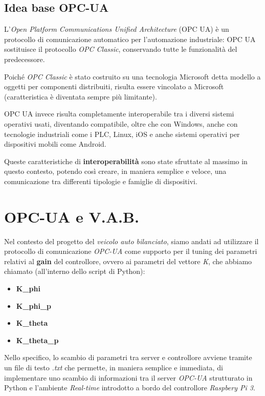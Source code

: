 \subsection{Idea base OPC-UA}
L'\textit{Open Platform Communications Unified Architecture} (OPC UA) è un protocollo di comunicazione automatico per l'automazione industriale: OPC UA sostituisce il protocollo \textit{OPC Classic}, conservando tutte le funzionalità del predecessore.

Poiché \textit{OPC Classic} è stato costruito su una tecnologia Microsoft detta modello a oggetti per componenti distribuiti, risulta essere vincolato a Microsoft (caratteristica è diventata sempre più limitante).

OPC UA invece risulta completamente interoperabile tra i diversi sistemi operativi usati, diventando compatibile, oltre che con Windows, anche con tecnologie industriali come i PLC, Linux, iOS e anche sistemi operativi per dispositivi mobili come Android.

Queste caratteristiche di \textbf{interoperabilità} sono state sfruttate al massimo in questo contesto, potendo così creare, in maniera semplice e veloce, una comunicazione tra differenti tipologie e famiglie di dispositivi.

\newpage
\section{OPC-UA e V.A.B.}
Nel contesto del progetto del \textit{veicolo auto bilanciato}, siamo andati ad utilizzare il protocollo di comunicazione \textit{OPC-UA} come supporto per il tuning dei parametri relativi al \textbf{gain} del controllore, ovvero ai parametri del vettore \textit{K}, che abbiamo chiamato (all'interno dello script di Python):
\begin{itemize}
	\item \textbf{K\_phi}
	\item \textbf{K\_phi\_p}
	\item \textbf{K\_theta}
	\item \textbf{K\_theta\_p}
\end{itemize}

Nello specifico, lo scambio di parametri tra server e controllore avviene tramite un file di testo \textit{.txt} che permette, in maniera semplice e immediata, di implementare uno scambio di informazioni tra il server \textit{OPC-UA} strutturato in Python e l'ambiente \textit{Real-time} introdotto a bordo del controllore \textit{Raspbery Pi 3}.


